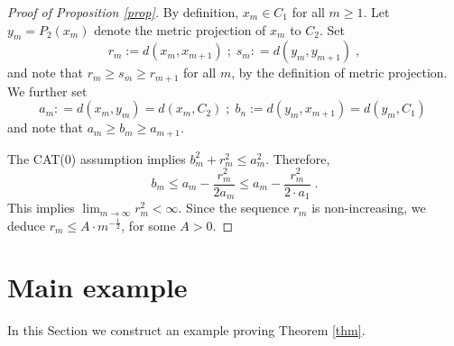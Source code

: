 \documentclass[12pt,leqno]{amsart}
\numberwithin{equation}{section}
\theoremstyle{remark}
\begin{document}
\begin{proof}[Proof of Proposition \ref{prop}]
By definition,  $x_m \in C_1$ for all $m \geq 1$. Let  $y_m= P_2 (x_m)$ denote the metric projection of $x_m$ to $C_2$.  
Set 
$$r_m:=d(x_m,x_{m+1}) \; ; \; s_m: = d(y_m,y_{m+1}) \;,$$
and note that $r_m \geq s_m \geq r_{m+1}$ for all $m$, by the definition of metric projection.
We further set
 $$  a_m: = d(x_m,y_m)= d(x_m,C_2) \; ; \;
 b_n:=d(y_m, x_{m+1})= d(y_m,C_1) \;$$
and note that  $a_m \geq b_m \geq a_{m+1}$.

The CAT(0) assumption implies  $b_m^2+r_m^2  \leq a_m^2$. Therefore,  
$$b_m \leq a_m - \frac {r_m^2} {2 a_m}   \leq a_m - \frac {r_m^2 } {2\cdot a_1} \;.  $$ 
This implies $\lim _{m\to \infty} r_m ^2 < \infty$.  Since the sequence $r_m$ is non-increasing, we deduce $r_m \leq A \cdot m ^{-\frac 1 2 }$, for some $A>0$. 
\end{proof}



\section{Main example}
In this  Section we construct an example proving Theorem \ref{thm}.
\end{document}
